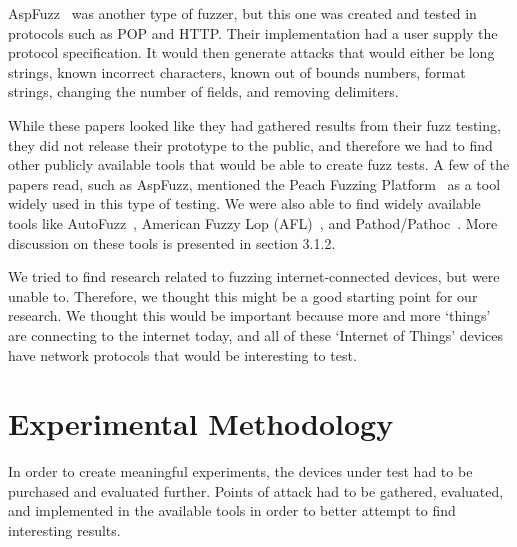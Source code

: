 \documentclass[letterpaper,twocolumn,10pt]{article}
\begin{document}
AspFuzz~\cite{aspfuzz} was another type of fuzzer, but this one was created and tested in protocols such as POP and HTTP. Their implementation had a user supply the protocol specification. It would then generate attacks that would either be long strings, known incorrect characters, known out of bounds numbers, format strings, changing the number of fields, and removing delimiters. 

While these papers looked like they had gathered results from their fuzz testing, they did not release their prototype to the public, and therefore we had to find other publicly available tools that would be able to create fuzz tests. A few of the papers read, such as AspFuzz, mentioned the Peach Fuzzing Platform~\cite{peach} as a tool widely used in this type of testing. We were also able to find widely available tools like AutoFuzz~\cite{autofuzz}, American Fuzzy Lop (AFL)~\cite{afl}, and Pathod/Pathoc~\cite{pathod}. More discussion on these tools is presented in section 3.1.2.

We tried to find research related to fuzzing internet-connected devices, but were unable to. Therefore, we thought this might be a good starting point for our research. We thought this would be important because more and more `things' are connecting to the internet today, and all of these `Internet of Things' devices have network protocols that would be interesting to test. 

\section{Experimental Methodology}
In order to create meaningful experiments, the devices under test had to be purchased and evaluated further. Points of attack had to be gathered, evaluated, and implemented in the available tools in order to better attempt to find interesting results.   
\end{document}
